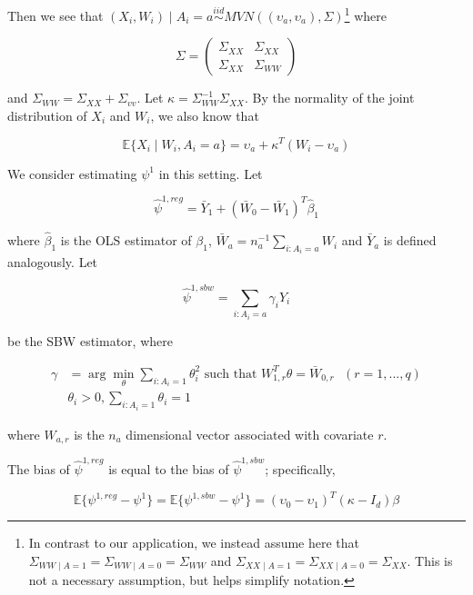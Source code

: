 Then we see that $(X_i, W_i) \mid A_i = a \stackrel{iid}{\sim} MVN((\upsilon_a, \upsilon_a), \Sigma)$\footnote{In contrast to our application, we instead assume here that $\Sigma_{WW \mid A = 1} = \Sigma_{WW \mid A = 0} = \Sigma_{WW}$ and $\Sigma_{XX \mid A = 1} = \Sigma_{XX \mid A = 0} = \Sigma_{XX}$. This is not a necessary assumption, but helps simplify notation.} where 

$$
\Sigma = \begin{pmatrix} 
\Sigma_{XX} & \Sigma_{XX} \\ 
\Sigma_{XX} & \Sigma_{WW}  
\end{pmatrix}
$$ 

and $\Sigma_{WW} = \Sigma_{XX} + \Sigma_{vv}$. Let $\kappa = \Sigma_{WW}^{-1}\Sigma_{XX}$. By the normality of the joint distribution of $X_i$ and $W_i$, we also know that

\begin{equation}
\mathbb{E}\{X_i \mid W_i, A_i = a\} = \upsilon_a + \kappa^T(W_i - \upsilon_a)
\end{equation}

We consider estimating $\psi^1$ in this setting. Let 

$$
\hat{\psi}^{1, reg} = \bar{Y}_1 + (\bar{W}_0 - \bar{W}_1)^T\hat{\beta}_1
$$ 

where $\hat{\beta}_1$ is the OLS estimator of $\beta_1$, $\bar{W}_a = n_a^{-1}\sum_{i:A_i = a} W_i$ and $\bar{Y}_a$ is defined analogously. Let 

$$
\hat{\psi}^{1, sbw} = \sum_{i: A_i = a} \gamma_i Y_i
$$ 

be the SBW estimator, where

\begin{align*}
\gamma &= \arg\min_{\theta} \sum_{i: A_i = 1}\theta_i^2 \text{ such that } W_{1, r}^T\theta = \bar{W}_{0, r} \ \ \ (r = 1, ..., q) \\
&\theta_i > 0, \sum_{i: A_i = 1}\theta_i = 1
\end{align*}

where $W_{a, r}$ is the $n_a$ dimensional vector associated with covariate $r$.

\begin{proposition}\label{cl1}
The bias of $\hat{\psi}^{1, reg}$ is equal to the bias of $\hat{\psi}^{1, sbw}$; specifically, 

$$
\mathbb{E}\{\psi^{1, reg} - \psi^1\} = \mathbb{E}\{\psi^{1, sbw} - \psi^1\} = (\upsilon_0 - \upsilon_1)^T(\kappa - I_d)\beta
$$
\end{proposition}

